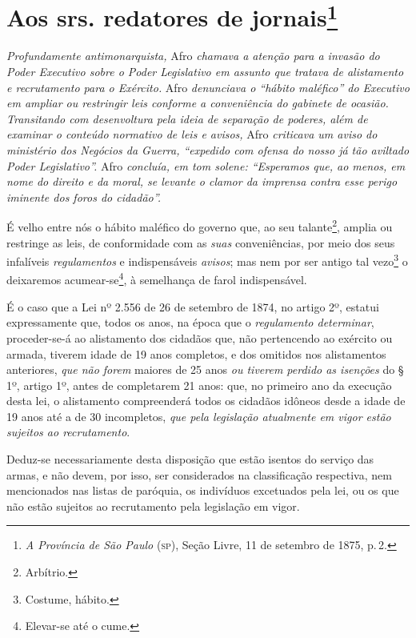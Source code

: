 \chapter{Aos srs. redatores de jornais\footnote{\emph{A Província de São Paulo} (\textsc{sp}), Seção Livre,
  11 de setembro de 1875, p.\,2.}} %

\begin{didascalia}
\emph{Profundamente antimonarquista,} Afro \emph{chamava a atenção para
a invasão do Poder Executivo sobre o Poder Legislativo em assunto que
tratava de alistamento e recrutamento para o Exército.} Afro
\emph{denunciava o ``hábito maléfico'' do Executivo em ampliar ou
restringir leis conforme a conveniência do gabinete de ocasião.
Transitando com desenvoltura pela ideia de separação de poderes, além de
examinar o conteúdo normativo de leis e avisos,} Afro \emph{criticava um
aviso do ministério dos Negócios da Guerra, ``expedido com ofensa do
nosso já tão aviltado Poder Legislativo''.} Afro \emph{concluía, em tom
solene: ``Esperamos que, ao menos, em nome do direito e da moral, se
levante o clamor da imprensa contra esse perigo iminente dos foros do
cidadão''.}
\end{didascalia}

É velho entre nós o hábito maléfico do governo que, ao seu
talante\footnote{ Arbítrio.}, amplia ou restringe as leis, de
conformidade com as \emph{suas} conveniências, por meio dos seus
infalíveis \emph{regulamentos} e indispensáveis \emph{avisos}; mas nem
por ser antigo tal vezo\footnote{ Costume, hábito.} o deixaremos
acumear-se\footnote{ Elevar-se até o cume.}, à semelhança de farol
indispensável.

É o caso que a Lei nº 2.556 de 26 de setembro de 1874, no artigo 2º,
estatui expressamente que, todos os anos, na época que o
\emph{regulamento determinar}, proceder-se-á ao alistamento dos cidadãos
que, não pertencendo ao exército ou armada, tiverem idade de 19 anos
completos, e dos omitidos nos alistamentos anteriores, \emph{que não
forem} maiores de 25 anos \emph{ou tiverem perdido as isenções} do § 1º,
artigo 1º, antes de completarem 21 anos: que, no primeiro ano da
execução desta lei, o alistamento compreenderá todos os cidadãos idôneos
desde a idade de 19 anos até a de 30 incompletos, \emph{que pela
legislação atualmente em vigor estão sujeitos ao recrutamento}.

Deduz-se necessariamente desta disposição que estão isentos do serviço
das armas, e não devem, por isso, ser considerados na classificação
respectiva, nem mencionados nas listas de paróquia, os indivíduos
excetuados pela lei, ou os que não estão sujeitos ao recrutamento pela
legislação em vigor.

